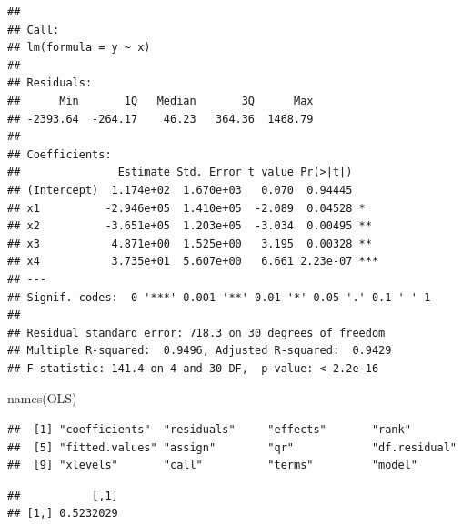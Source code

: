 \documentclass[
]{article}
\newenvironment{Shaded}{\begin{snugshade}}{\end{snugshade}}
\newcommand{\DecValTok}[1]{\textcolor[rgb]{0.00,0.00,0.81}{#1}}
\newcommand{\FunctionTok}[1]{\textcolor[rgb]{0.00,0.00,0.00}{#1}}
\newcommand{\NormalTok}[1]{#1}
\newcommand{\OtherTok}[1]{\textcolor[rgb]{0.56,0.35,0.01}{#1}}
\newcommand{\SpecialCharTok}[1]{\textcolor[rgb]{0.00,0.00,0.00}{#1}}
\begin{document}
\begin{verbatim}
## 
## Call:
## lm(formula = y ~ x)
## 
## Residuals:
##      Min       1Q   Median       3Q      Max 
## -2393.64  -264.17    46.23   364.36  1468.79 
## 
## Coefficients:
##               Estimate Std. Error t value Pr(>|t|)    
## (Intercept)  1.174e+02  1.670e+03   0.070  0.94445    
## x1          -2.946e+05  1.410e+05  -2.089  0.04528 *  
## x2          -3.651e+05  1.203e+05  -3.034  0.00495 ** 
## x3           4.871e+00  1.525e+00   3.195  0.00328 ** 
## x4           3.735e+01  5.607e+00   6.661 2.23e-07 ***
## ---
## Signif. codes:  0 '***' 0.001 '**' 0.01 '*' 0.05 '.' 0.1 ' ' 1
## 
## Residual standard error: 718.3 on 30 degrees of freedom
## Multiple R-squared:  0.9496, Adjusted R-squared:  0.9429 
## F-statistic: 141.4 on 4 and 30 DF,  p-value: < 2.2e-16
\end{verbatim}

\begin{Shaded}
\begin{Highlighting}[]
 \FunctionTok{names}\NormalTok{(OLS)}
\end{Highlighting}
\end{Shaded}

\begin{verbatim}
##  [1] "coefficients"  "residuals"     "effects"       "rank"         
##  [5] "fitted.values" "assign"        "qr"            "df.residual"  
##  [9] "xlevels"       "call"          "terms"         "model"
\end{verbatim}

\begin{Shaded}
\end{Shaded}

\begin{verbatim}
##           [,1]
## [1,] 0.5232029
\end{verbatim}

\printbibliography
\end{document}

